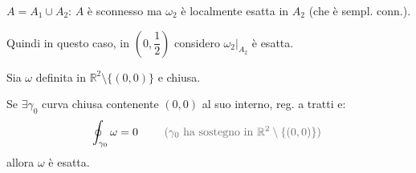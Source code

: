 \begin{esercizio}[EXE]
\begin{center}
\end{center}
$A = A_1 \cup A_2$: $A$ è sconnesso ma $\omega_2$ è localmente esatta in $A_2$ (che è sempl. conn.).

Quindi in questo caso, in $\left(0, \dfrac{1}{2}\right)$ considero $\omega_2\big|_{A_2}$ è esatta.
\end{esercizio}

\begin{theorem}
Sia $\omega$ definita in $\mathbb{R}^2 \setminus \{ (0, 0) \}$  e chiusa.

Se $\exists \gamma_0$ curva chiusa contenente $(0, 0)$ al suo interno, reg. a tratti e:
\[
\oint_{\gamma_0} \omega = 0 \qquad \text{\pencilnote{($\gamma_0$ ha sostegno in $\mathbb{R}^2 \setminus \{ (0, 0) \}$)}}
\]
allora $\omega$ è esatta.
\end{theorem}

